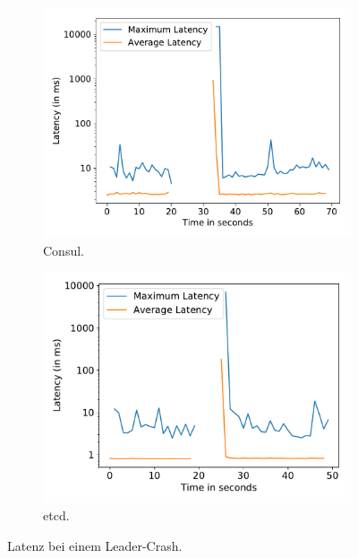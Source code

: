 \begin{figure}[t]
\begin{subfigure}[t]{0.49\textwidth}
		\includegraphics[width=\textwidth]{img/leader_crash_consul.pdf}
		\caption{Consul.}
	\end{subfigure}
	\begin{subfigure}[t]{0.49\textwidth}
		\includegraphics[width=\textwidth]{img/leader_crash_etcd.pdf}
		\caption{etcd.}
	\end{subfigure}
	\caption{Latenz bei einem Leader-Crash.}
	\label{fig:leader-crash}
\end{figure}

